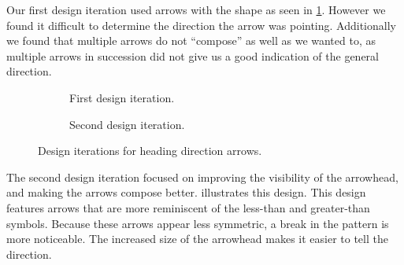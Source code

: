 
Our first design iteration used arrows with the shape as seen in \cref{fig:first_arrow_design}. However we found it difficult to determine the direction the arrow was pointing. Additionally we found that multiple arrows do not \enquote{compose} as well as we wanted to, as multiple arrows in succession did not give us a good indication of the general direction.

\begin{figure}[htbp]
\begin{subfigure}[c]{.49\linewidth}
    \centering
    \caption{First design iteration.}
    \label{fig:first_arrow_design}
\end{subfigure}
%
\begin{subfigure}[c]{.49\linewidth}
    \centering
    \caption{Second design iteration.}
    \label{fig:second_arrow_design}
\end{subfigure}
\caption{Design iterations for heading direction arrows.}
\end{figure}



The second design iteration focused on improving the visibility of the arrowhead, and making the arrows compose better.  illustrates this design. This design features arrows that are more reminiscent of the less-than and greater-than symbols. Because these arrows appear less symmetric, a break in the pattern is more noticeable. The  increased size of the arrowhead makes it easier to tell the direction.

